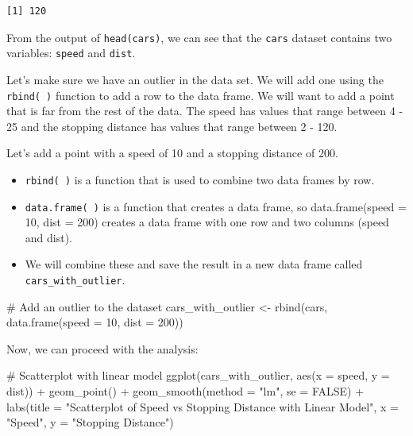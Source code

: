 \documentclass[
  letterpaper,
  DIV=11,
  numbers=noendperiod]{scrreprt}
\newenvironment{Shaded}{\begin{snugshade}}{\end{snugshade}}
\newcommand{\AttributeTok}[1]{\textcolor[rgb]{0.40,0.45,0.13}{#1}}
\newcommand{\CommentTok}[1]{\textcolor[rgb]{0.37,0.37,0.37}{#1}}
\newcommand{\ConstantTok}[1]{\textcolor[rgb]{0.56,0.35,0.01}{#1}}
\newcommand{\DecValTok}[1]{\textcolor[rgb]{0.68,0.00,0.00}{#1}}
\newcommand{\FunctionTok}[1]{\textcolor[rgb]{0.28,0.35,0.67}{#1}}
\newcommand{\NormalTok}[1]{\textcolor[rgb]{0.00,0.23,0.31}{#1}}
\newcommand{\OtherTok}[1]{\textcolor[rgb]{0.00,0.23,0.31}{#1}}
\newcommand{\SpecialCharTok}[1]{\textcolor[rgb]{0.37,0.37,0.37}{#1}}
\newcommand{\StringTok}[1]{\textcolor[rgb]{0.13,0.47,0.30}{#1}}
\providecommand{\tightlist}{%
  \setlength{\itemsep}{0pt}\setlength{\parskip}{0pt}}\usepackage{longtable,booktabs,array}
\begin{document}
\begin{verbatim}
[1] 120
\end{verbatim}

From the output of \texttt{head(cars)}, we can see that the
\texttt{cars} dataset contains two variables: \texttt{speed} and
\texttt{dist}.

Let's make sure we have an outlier in the data set. We will add one
using the \texttt{rbind(\ )} function to add a row to the data frame. We
will want to add a point that is far from the rest of the data. The
speed has values that range between 4 - 25 and the stopping distance has
values that range between 2 - 120.

Let's add a point with a speed of 10 and a stopping distance of 200.

\begin{itemize}
\tightlist
\item
  \texttt{rbind(\ )} is a function that is used to combine two data
  frames by row.
\item
  \texttt{data.frame(\ )} is a function that creates a data frame, so
  data.frame(speed = 10, dist = 200) creates a data frame with one row
  and two columns (speed and dist).
\item
  We will combine these and save the result in a new data frame called
  \texttt{cars\_with\_outlier}.
\end{itemize}

\begin{Shaded}
\begin{Highlighting}[]
\CommentTok{\# Add an outlier to the dataset}
\NormalTok{cars\_with\_outlier }\OtherTok{\textless{}{-}} \FunctionTok{rbind}\NormalTok{(cars, }\FunctionTok{data.frame}\NormalTok{(}\AttributeTok{speed =} \DecValTok{10}\NormalTok{, }\AttributeTok{dist =} \DecValTok{200}\NormalTok{))}
\end{Highlighting}
\end{Shaded}

Now, we can proceed with the analysis:

\begin{Shaded}
\begin{Highlighting}[]
\CommentTok{\# Scatterplot with linear model}
\FunctionTok{ggplot}\NormalTok{(cars\_with\_outlier, }\FunctionTok{aes}\NormalTok{(}\AttributeTok{x =}\NormalTok{ speed, }\AttributeTok{y =}\NormalTok{ dist)) }\SpecialCharTok{+}
  \FunctionTok{geom\_point}\NormalTok{() }\SpecialCharTok{+}
  \FunctionTok{geom\_smooth}\NormalTok{(}\AttributeTok{method =} \StringTok{"lm"}\NormalTok{, }\AttributeTok{se =} \ConstantTok{FALSE}\NormalTok{) }\SpecialCharTok{+}
  \FunctionTok{labs}\NormalTok{(}\AttributeTok{title =} \StringTok{"Scatterplot of Speed vs Stopping Distance with Linear Model"}\NormalTok{, }\AttributeTok{x =} \StringTok{"Speed"}\NormalTok{, }\AttributeTok{y =} \StringTok{"Stopping Distance"}\NormalTok{)}
\end{Highlighting}
\end{Shaded}
\end{document}

